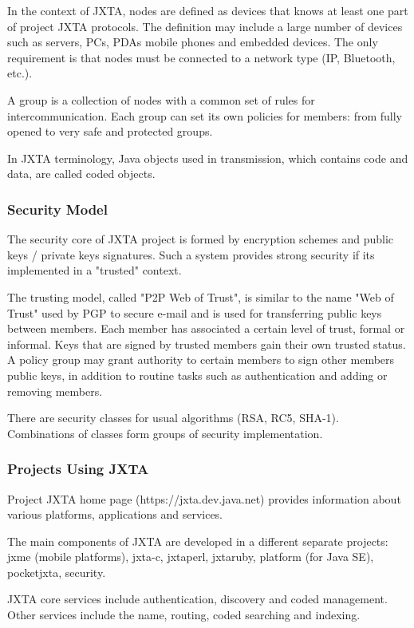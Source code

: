 In the context of JXTA, nodes are defined as devices that knows at least one
part of project JXTA protocols. The definition may include a large number of
devices such as servers, PCs, PDAs mobile phones and embedded devices. The only
requirement is that nodes must be connected to a network type (IP, Bluetooth,
etc.).

A group is a collection of nodes with a common set of rules for
intercommunication. Each group  can set its own policies for members: from
fully opened to very safe and protected groups.

In JXTA terminology, Java objects used in transmission, which contains code and
data, are called coded objects.

\subsubsection{Security Model}

The security core of JXTA project is formed by encryption schemes and public
keys / private keys signatures. Such a system provides strong security if its
implemented in a "trusted" context.

The trusting model, called "P2P Web of Trust", is similar to the name "Web of
Trust" used by PGP to secure e-mail and is used for transferring public keys
between members. Each member has associated a certain level of trust, formal or
informal. Keys  that are signed by trusted members gain their own trusted
status. A policy group may grant authority to certain members to sign other
members public keys, in addition to routine tasks such as authentication and
adding or removing members.

There are security classes for usual algorithms (RSA, RC5, SHA-1). Combinations
of classes form groups of security implementation.

\subsubsection{Projects Using JXTA}

Project JXTA home page (https://jxta.dev.java.net) provides information about
various platforms, applications and services.

The main components of JXTA are developed in a different separate projects:
jxme (mobile platforms), jxta-c, jxtaperl, jxtaruby, platform (for Java SE),
pocketjxta, security.

JXTA core services include authentication, discovery and coded management.
Other services include the name, routing, coded searching and indexing.

